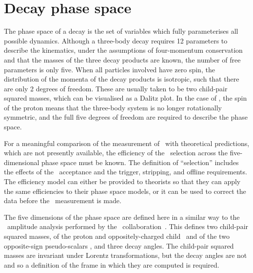 \section{Decay phase space}
\label{chap:cpv:theory:phsp}

The phase space of a decay is the set of variables which fully parameterises 
all possible dynamics.
Although a three-body decay requires 12 parameters to describe the kinematics, 
under the assumptions of four-momentum conservation and that the masses of the 
three decay products are known, the number of free parameters is only five.
When all particles involved have zero spin, the distribution of the momenta of 
the decay products is isotropic, such that there are only 2 degrees of freedom.
These are usually taken to be two child-pair squared masses, which can be 
visualised as a Dalitz plot.
In the case of \LcTophh, the spin  of the proton means that the 
three-body system is no longer rotationally symmetric, and the full five 
degrees of freedom are required to describe the phase space.

For a meaningful comparison of the measurement of \dACP\ with theoretical 
predictions, which are not presently available, the efficiency of the 
\PLambdac\ selection across the five-dimensional phase space must be known.
The definition of ``selection'' includes the effects of the \lhcb\ acceptance 
and the trigger, stripping, and offline requirements.
The efficiency model can either be provided to theorists so that they can apply 
the same efficiencies to their phase space models, or it can be used to correct 
the data before the \dACP\ measurement is made.

The five dimensions of the phase space are defined here in a similar way to the 
\LcTopKpi\ amplitude analysis performed by the \esno\ 
collaboration~\cite{Aitala:1999uq}.
This defines two child-pair squared masses, of the proton and 
oppositely-charged child \msqphm\ and of the two opposite-sign pseudo-scalars 
\msqhh, and three decay angles.
The child-pair squared masses are invariant under Lorentz transformations, but 
the decay angles are not and so a definition of the frame in which they are 
computed is required.


